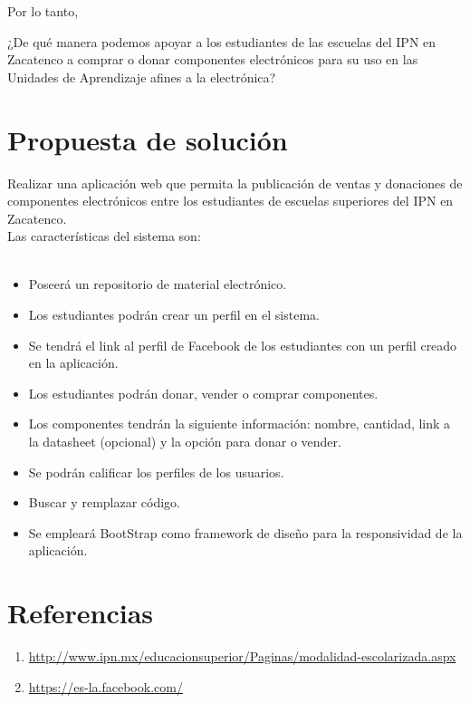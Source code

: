 Por lo tanto,

¿De qu\'e manera podemos apoyar a los estudiantes de las escuelas del IPN en Zacatenco a comprar o donar componentes electr\'onicos para su uso en las Unidades de Aprendizaje afines a la electr\'onica?

\section{Propuesta de soluci\'on}
Realizar una aplicaci\'on web que permita la publicaci\'on de ventas y donaciones de componentes electr\'onicos entre los estudiantes de escuelas superiores del IPN en Zacatenco.\\
Las caracter\'isticas del sistema son:\\ \\
\begin{itemize}
    \item Poseer\'a un repositorio de material electr\'onico.
    \item Los estudiantes podr\'an crear un perfil en el sistema.
    \item Se tendr\'a el link al perfil de Facebook de los estudiantes con un perfil creado en la aplicaci\'on.
    \item Los estudiantes podr\'an donar, vender o comprar componentes.
    \item Los componentes tendr\'an la siguiente informaci\'on: nombre, cantidad, link a la datasheet (opcional) y la opci\'on para donar o vender.
    \item Se podr\'an calificar los perfiles de los usuarios.
    \item Buscar y remplazar código.
    \item Se emplear\'a BootStrap como framework de diseño para la responsividad de la aplicaci\'on.
\end{itemize}


\section{Referencias}
\begin{enumerate}
    \item \url{http://www.ipn.mx/educacionsuperior/Paginas/modalidad-escolarizada.aspx}
    \item \url{https://es-la.facebook.com/}
\end{enumerate}











 
